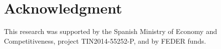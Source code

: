 \documentclass[preprint,12pt]{elsarticle}
\begin{document}
\section*{Acknowledgment}
This research was supported by the Spanish Ministry of Economy and Competitiveness, project TIN2014-55252-P, and by FEDER funds.


   
\end{document}
